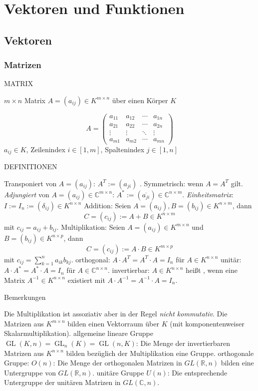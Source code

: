 \documentclass[fontsize=12pt,paper=a4,twoside,bibtotoc,idxtotoc,
liststotoc,pagesize,BCOR1.2cm,DIV15,chapterprefix,pagesize=pdftex]{scrbook}
\theoremstyle{plain}
\theoremstyle{definition}
\theoremstyle{remark}
\begin{document}
\chapter{Vektoren und Funktionen}
\section{Vektoren}
\subsection{Matrizen}

MATRIX

{\color{red} $m \times n$ Matrix} $A=(a_{ij}) \in K^{m\times n}$ über einen Körper $K$ 

\[ A = \left( \begin{array}{cccc}
a_{11} & a_{12} & \cdots & a_{1n} \\
a_{21} & a_{22} & \cdots & a_{2n} \\
\vdots & \vdots & \ddots & \vdots \\
a_{m1} & a_{m2} & \cdots & a_{mn} 
\end{array} \right) \] 
$a_{ij} \in K$, Zeilenindex $i \in [1,m]$, Spaltenindex $j \in [1,n]$

DEFINITIONEN


 {\color{red} Transponiert} von $A=(a_{ij})$: $A^T:=(a_{ji})$ .
 {\color{red} Symmetrisch}: wenn $A=A^T$ gilt.
 \emph{Adjungiert} von $A=(a_{ij})\in \mathbb{C}^{m\times n}$: $A^* :=
(\overline{a_{ji}}) \in \mathbb{C}^{n \times m}$.
 \emph{Einheitsmatrix}: $I:=I_n:=(\delta_{ij}) \in K^{n \times
n}$
 {\color{red} Addition}: Seien $A=(a_{ij}),B=(b_{ij}) \in {K}^{n \times m}$, dann
\[ C=(c_{ij}):=A+B \in {K}^{n \times m} \]
mit $c_{ij}=a_{ij}+b_{ij}$. 
  {\color{red} Multiplikation}: Seien $A=(a_{ij}) \in {K}^{m \times n}$ und $B=(b_{ij})
\in {K}^{n \times p}$, dann 
\[ C=(c_{ij}):=A \cdot B \in{K}^{m \times p} \]
mit $c_{ij}=\sum_{k=1}^n a_{ik} b_{kj}$. 
 {\color{red} orthogonal}: $A \cdot A^T=A^T \cdot A=I_n$ für $A\in K^{n \times n}$ 
 {\color{red} unitär}: $A \cdot A^*=A^* \cdot A=I_n$ für $A\in \mathbb{C}^{n \times n}$.
 {\color{red} invertierbar}: $A\in K^{n \times n}$ heißt , wenn eine
Matrix $A^{-1}\in K^{n \times n}$ existiert mit  $A \cdot
A^{-1}=A^{-1} \cdot A=I_n$.


Bemerkungen


 Die Multiplikation ist assoziativ aber in der Regel \emph{nicht kommutativ}. 
 Die Matrizen aus $K^{m \times n}$ bilden einen Vektorraum über
$K$ (mit komponentenweiser Skalarmultiplikation).
 {\color{red} allgemeine
lineare Gruppe} $\operatorname{GL}(K,n) = \operatorname{GL}_n(K) = \operatorname{GL}(n,K)$: 
Die Menge der invertierbaren Matrizen aus $K^{n \times n}$ bilden bezüglich der Multiplikation eine Gruppe.
 {\color{red} orthogonale Gruppe}: $O(n)$: Die Menge der orthogonalen Matrizen in $GL(\mathbb{R},n)$ bilden
 eine Untergruppe von  $GL(\mathbb{R},n)$. 
  {\color{red} unitäre Gruppe} $U(n)$: Die entsprechende Untergruppe der unitären Matrizen in $GL(\mathbb{C},n)$.
\end{document}
